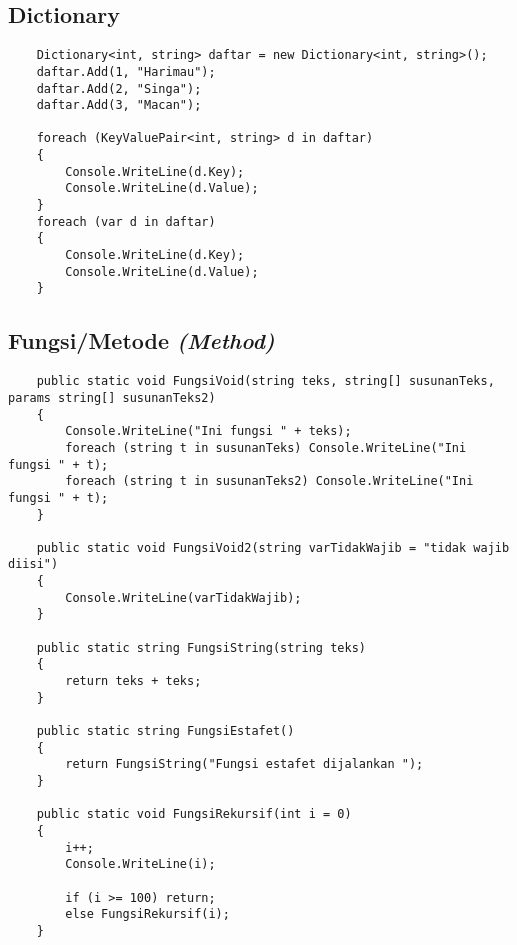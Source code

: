 \documentclass{book}
\begin{document}
	\subsection{Dictionary}
	\begin{lstlisting}
	Dictionary<int, string> daftar = new Dictionary<int, string>();
	daftar.Add(1, "Harimau");
	daftar.Add(2, "Singa");
	daftar.Add(3, "Macan");
	
	foreach (KeyValuePair<int, string> d in daftar)
	{
		Console.WriteLine(d.Key);
		Console.WriteLine(d.Value);
	}
	foreach (var d in daftar)
	{
		Console.WriteLine(d.Key);
		Console.WriteLine(d.Value);
	}
	\end{lstlisting}
	
	\subsection{Fungsi/Metode \textit{(Method)}}
	\begin{lstlisting}
	public static void FungsiVoid(string teks, string[] susunanTeks, params string[] susunanTeks2)
	{
		Console.WriteLine("Ini fungsi " + teks);
		foreach (string t in susunanTeks) Console.WriteLine("Ini fungsi " + t);
		foreach (string t in susunanTeks2) Console.WriteLine("Ini fungsi " + t);
	}
	
	public static void FungsiVoid2(string varTidakWajib = "tidak wajib diisi")
	{
		Console.WriteLine(varTidakWajib);
	}
	
	public static string FungsiString(string teks)
	{
		return teks + teks;
	}
	
	public static string FungsiEstafet()
	{
		return FungsiString("Fungsi estafet dijalankan ");
	}
	
	public static void FungsiRekursif(int i = 0)
	{
		i++;
		Console.WriteLine(i);
		
		if (i >= 100) return;
		else FungsiRekursif(i);
	}
	\end{lstlisting}
	
\end{document}
